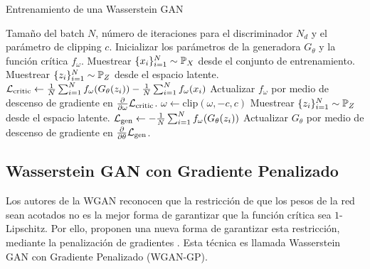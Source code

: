 \begin{algorithm}[H]

    \caption{Entrenamiento de una Wasserstein GAN \cite{arjovsky2017wasserstein}}\label{alg:WGAN}

    \begin{algorithmic}[1]
        \Require Tamaño del batch $N$, número de iteraciones para el discriminador $N_d$ y el parámetro de clipping $c$.
        \State Inicializar los parámetros de la generadora $G_\theta$ y la función crítica $f_\omega$.
        \State Muestrear $\{x_i\}_{i=1}^{N} \sim \Prob_X$ desde el conjunto de entrenamiento.
        \State Muestrear $\{z_i\}_{i=1}^{N} \sim \Prob_Z$ desde el espacio latente.
        \State $\mathcal{L}_{\mathrm{critic}} \gets
            \frac{1}{N} \sum_{i=1}^{N} f_{\omega}(G_\theta(z_i)) - \frac{1}{N} \sum_{i=1}^{N} f_{\omega}(x_i)$ 
        \State Actualizar $f_{\omega}$ por medio de descenso de gradiente en $\pdv{\omega} \mathcal{L}_{\mathrm{critic}}$.
        \State $\omega \gets \text{clip}(\omega, -c, c)$
        \EndFor
        \State Muestrear $\{z_i\}_{i=1}^{N} \sim \Prob_Z$ desde el espacio latente.
        \State $\mathcal{L}_{\mathrm{gen}} \gets - \frac{1}{N}\sum_{i=1}^{N} f_\omega(G_\theta(z_i))$ 
        \State Actualizar $G_\theta$ por medio de descenso de gradiente en $\pdv{\theta} \mathcal{L}_{\mathrm{gen}}$.
        \EndWhile
    \end{algorithmic}
\end{algorithm}


\subsection{Wasserstein GAN con Gradiente Penalizado}\label{ssec:wgan-gp}  %
Los autores de la WGAN reconocen que la restricción de que los pesos de la red sean acotados no es la mejor forma de garantizar que la función crítica sea $1$-Lipschitz. Por ello, proponen una nueva forma de garantizar esta restricción, mediante la penalización de gradientes \cite{gulrajani2017improved}. Esta técnica es llamada Wasserstein GAN con Gradiente Penalizado (WGAN-GP).


